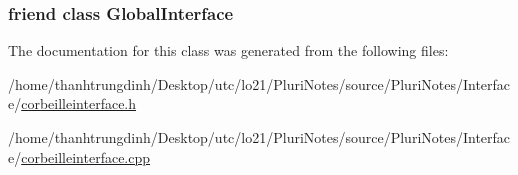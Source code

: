 \subsubsection[{\texorpdfstring{Global\+Interface}{GlobalInterface}}]{\setlength{\rightskip}{0pt plus 5cm}friend class {\bf Global\+Interface}\hspace{0.3cm}{\ttfamily [friend]}}\hypertarget{classcorbeilleInterface_a2250a78aa5cceb79c3e34da3f1fe0fde}{}\label{classcorbeilleInterface_a2250a78aa5cceb79c3e34da3f1fe0fde}


The documentation for this class was generated from the following files\+:\begin{DoxyCompactItemize}
\item 
/home/thanhtrungdinh/\+Desktop/utc/lo21/\+Pluri\+Notes/source/\+Pluri\+Notes/\+Interface/\hyperlink{corbeilleinterface_8h}{corbeilleinterface.\+h}\item 
/home/thanhtrungdinh/\+Desktop/utc/lo21/\+Pluri\+Notes/source/\+Pluri\+Notes/\+Interface/\hyperlink{corbeilleinterface_8cpp}{corbeilleinterface.\+cpp}\end{DoxyCompactItemize}
